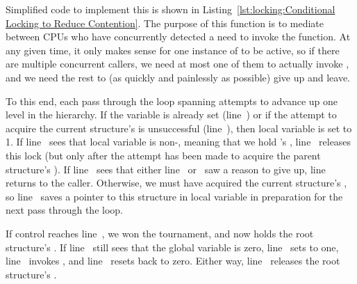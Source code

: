 Simplified code to implement this is shown in
Listing~\ref{lst:locking:Conditional Locking to Reduce Contention}.
The purpose of this function is to mediate between CPUs who have concurrently
detected a need to invoke the  function.
At any given time, it only makes sense for one instance of
 to be active, so if there are multiple
concurrent callers, we need at most one of them to actually invoke
, and we need the rest to (as quickly and
painlessly as possible) give up and leave.

\begin{fcvref}
To this end, each pass through the loop spanning  attempts
to advance up one level in the  hierarchy.
If the  variable is already set (line~) or if the attempt
to acquire the current  structure's  is
unsuccessful (line~), then local variable  is set to 1.
If line~ sees that local variable  is non-,
meaning that we hold 's ,
line~ releases this lock (but only after the attempt has been made
to acquire the parent  structure's ).
If line~ sees that either line~ or~
saw a reason to give up,
line~ returns to the caller.
Otherwise, we must have acquired the current  structure's
, so line~ saves a pointer to this structure in local
variable  in preparation for the next pass through the loop.

If control reaches line~, we won the tournament, and now holds the
root  structure's .
If line~ still sees that the global variable  is zero,
line~ sets  to one, line~ invokes
,
and line~ resets  back to zero.
Either way, line~ releases the root  structure's
.
\end{fcvref}

